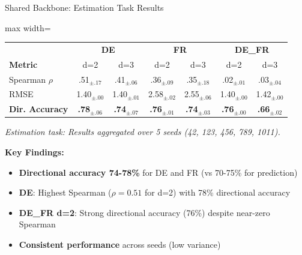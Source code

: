\documentclass[aspectratio=169]{beamer}
\begin{document}
\begin{frame}{Shared Backbone: Estimation Task Results}
\begin{table}
\centering
\small
\begin{adjustbox}{max width=\textwidth}
\begin{tabular}{l|cc|cc|cc}
\toprule
& \multicolumn{2}{c|}{\textbf{DE}} & \multicolumn{2}{c|}{\textbf{FR}} & \multicolumn{2}{c}{\textbf{DE\_FR}} \\
\textbf{Metric} & d=2 & d=3 & d=2 & d=3 & d=2 & d=3 \\
\midrule
Spearman $\rho$ & .51$_{\pm.17}$ & .41$_{\pm.06}$ & .36$_{\pm.09}$ & .35$_{\pm.18}$ & .02$_{\pm.01}$ & .03$_{\pm.04}$ \\
RMSE & 1.40$_{\pm.00}$ & 1.40$_{\pm.01}$ & 2.58$_{\pm.02}$ & 2.55$_{\pm.06}$ & 1.40$_{\pm.00}$ & 1.42$_{\pm.00}$ \\
\textbf{Dir. Accuracy} & \textbf{.78}$_{\pm.06}$ & \textbf{.74}$_{\pm.07}$ & \textbf{.76}$_{\pm.01}$ & \textbf{.74}$_{\pm.03}$ & \textbf{.76}$_{\pm.00}$ & \textbf{.66}$_{\pm.02}$ \\
\bottomrule
\end{tabular}
\end{adjustbox}
\end{table}

{\scriptsize \textit{Estimation task: Results aggregated over 5 seeds (42, 123, 456, 789, 1011).}}

\vspace{0.3cm}
\textbf{Key Findings:}
\begin{itemize}
    \item \textbf{Directional accuracy 74-78\%} for DE and FR (vs 70-75\% for prediction)
    \item \textbf{DE}: Highest Spearman ($\rho = 0.51$ for d=2) with 78\% directional accuracy
    \item \textbf{DE\_FR d=2}: Strong directional accuracy (76\%) despite near-zero Spearman
    \item \textbf{Consistent performance} across seeds (low variance)
\end{itemize}
\end{frame}
\end{document}
